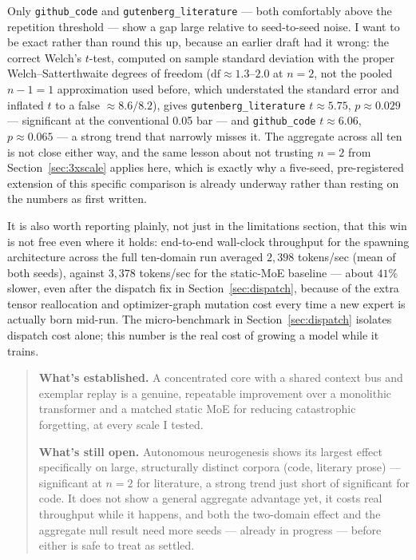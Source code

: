 \documentclass[11pt,letterpaper]{article}
\begin{document}
Only \texttt{github\_code} and \texttt{gutenberg\_literature} --- both comfortably above the repetition threshold --- show a gap large relative to seed-to-seed noise. I want to be exact rather than round this up, because an earlier draft had it wrong: the correct Welch's $t$-test, computed on sample standard deviation with the proper Welch--Satterthwaite degrees of freedom ($\mathrm{df}\approx1.3$--$2.0$ at $n=2$, not the pooled $n-1=1$ approximation used before, which understated the standard error and inflated $t$ to a false $\approx8.6/8.2$), gives \texttt{gutenberg\_literature} $t\approx5.75$, $p\approx0.029$ --- significant at the conventional 0.05 bar --- and \texttt{github\_code} $t\approx6.06$, $p\approx0.065$ --- a strong trend that narrowly misses it. The aggregate across all ten is not close either way, and the same lesson about not trusting $n=2$ from Section~\ref{sec:3xscale} applies here, which is exactly why a five-seed, pre-registered extension of this specific comparison is already underway rather than resting on the numbers as first written.

It is also worth reporting plainly, not just in the limitations section, that this win is not free even where it holds: end-to-end wall-clock throughput for the spawning architecture across the full ten-domain run averaged $2{,}398$ tokens/sec (mean of both seeds), against $3{,}378$ tokens/sec for the static-MoE baseline --- about $41\%$ slower, even after the dispatch fix in Section~\ref{sec:dispatch}, because of the extra tensor reallocation and optimizer-graph mutation cost every time a new expert is actually born mid-run. The micro-benchmark in Section~\ref{sec:dispatch} isolates dispatch cost alone; this number is the real cost of growing a model while it trains.

\begin{quote}
\textbf{What's established.} A concentrated core with a shared context bus and exemplar replay is a genuine, repeatable improvement over a monolithic transformer and a matched static MoE for reducing catastrophic forgetting, at every scale I tested.

\textbf{What's still open.} Autonomous neurogenesis shows its largest effect specifically on large, structurally distinct corpora (code, literary prose) --- significant at $n=2$ for literature, a strong trend just short of significant for code. It does not show a general aggregate advantage yet, it costs real throughput while it happens, and both the two-domain effect and the aggregate null result need more seeds --- already in progress --- before either is safe to treat as settled.
\end{quote}
\end{document}
